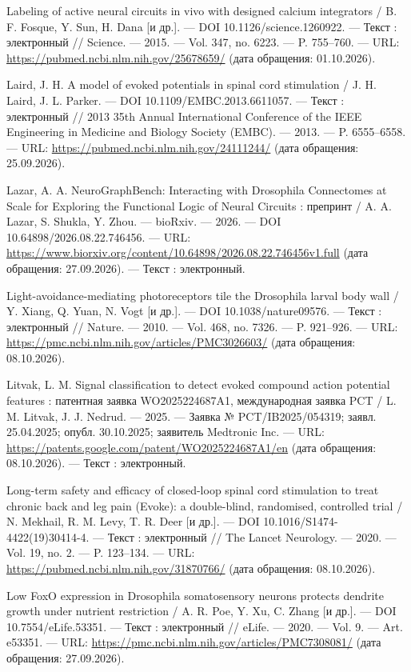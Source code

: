 \begin{list}{}{\setlength{\leftmargin}{10mm}\setlength{\labelwidth}{8mm}\setlength{\labelsep}{2mm}\setlength{\itemsep}{0pt}\setlength{\parsep}{0pt}\setlength{\topsep}{0pt}}
\item[171.] Labeling of active neural circuits in vivo with designed calcium integrators / B. F. Fosque, Y. Sun, H. Dana [и др.]. — DOI 10.1126/science.1260922. — Текст : электронный // Science. — 2015. — Vol. 347, no. 6223. — P. 755–760. — URL: \url{https://pubmed.ncbi.nlm.nih.gov/25678659/} (дата обращения: 01.10.2026).
\item[172.] Laird, J. H. A model of evoked potentials in spinal cord stimulation / J. H. Laird, J. L. Parker. — DOI 10.1109/EMBC.2013.6611057. — Текст : электронный // 2013 35th Annual International Conference of the IEEE Engineering in Medicine and Biology Society (EMBC). — 2013. — P. 6555–6558. — URL: \url{https://pubmed.ncbi.nlm.nih.gov/24111244/} (дата обращения: 25.09.2026).
\item[173.] Lazar, A. A. NeuroGraphBench: Interacting with Drosophila Connectomes at Scale for Exploring the Functional Logic of Neural Circuits : препринт / A. A. Lazar, S. Shukla, Y. Zhou. — bioRxiv. — 2026. — DOI 10.64898/2026.08.22.746456. — URL: \url{https://www.biorxiv.org/content/10.64898/2026.08.22.746456v1.full} (дата обращения: 27.09.2026). — Текст : электронный.
\item[174.] Light-avoidance-mediating photoreceptors tile the Drosophila larval body wall / Y. Xiang, Q. Yuan, N. Vogt [и др.]. — DOI 10.1038/nature09576. — Текст : электронный // Nature. — 2010. — Vol. 468, no. 7326. — P. 921–926. — URL: \url{https://pmc.ncbi.nlm.nih.gov/articles/PMC3026603/} (дата обращения: 08.10.2026).
\item[175.] Litvak, L. M. Signal classification to detect evoked compound action potential features : патентная заявка WO2025224687A1, международная заявка PCT / L. M. Litvak, J. J. Nedrud. — 2025. — Заявка № PCT/IB2025/054319; заявл. 25.04.2025; опубл. 30.10.2025; заявитель Medtronic Inc. — URL: \url{https://patents.google.com/patent/WO2025224687A1/en} (дата обращения: 08.10.2026). — Текст : электронный.
\item[176.] Long-term safety and efficacy of closed-loop spinal cord stimulation to treat chronic back and leg pain (Evoke): a double-blind, randomised, controlled trial / N. Mekhail, R. M. Levy, T. R. Deer [и др.]. — DOI 10.1016/S1474-4422(19)30414-4. — Текст : электронный // The Lancet Neurology. — 2020. — Vol. 19, no. 2. — P. 123–134. — URL: \url{https://pubmed.ncbi.nlm.nih.gov/31870766/} (дата обращения: 08.10.2026).
\item[177.] Low FoxO expression in Drosophila somatosensory neurons protects dendrite growth under nutrient restriction / A. R. Poe, Y. Xu, C. Zhang [и др.]. — DOI 10.7554/eLife.53351. — Текст : электронный // eLife. — 2020. — Vol. 9. — Art. e53351. — URL: \url{https://pmc.ncbi.nlm.nih.gov/articles/PMC7308081/} (дата обращения: 27.09.2026).

\end{list}
